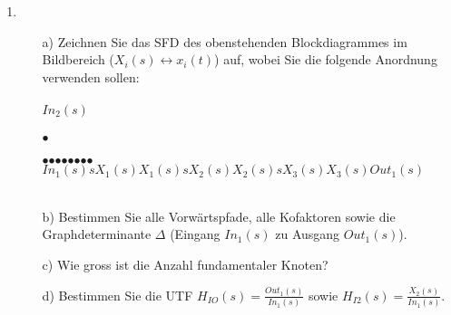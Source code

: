 \begin{enumerate}
\newpage
\item{}~\\
 \vspace*{-2mm} \begin{center}     \end{center} %
\begin{enumerate}
\item[a)] Zeichnen Sie das SFD des obenstehenden Blockdiagrammes im Bildbereich ($X_i(s)\leftrightarrow x_i(t)$) auf, wobei Sie die folgende Anordnung verwenden sollen:\\
\vspace*{0.5cm}\\
\hspace*{9.8cm}$In_2(s)$\\
\vspace*{-0.3cm}\\
\hspace*{9.9cm}$\bullet$\\
\vspace*{1.8cm}\\
\hspace*{0cm}$\bullet$\hspace*{1.8cm}$\bullet$\hspace*{1.8cm}$\bullet$\hspace*{1.8cm}$\bullet$\hspace*{1.8cm}$\bullet$\hspace*{1.8cm}$\bullet$\hspace*{1.89cm}$\bullet$\hspace*{1.98cm}$\bullet$\\
\hspace*{-0.45cm}$In_1(s)$\hspace*{0.92cm}$sX_1(s)$\hspace*{0.92cm}$X_1(s)$\hspace*{0.93cm}$sX_2(s)$\hspace*{0.93cm}$X_2(s)$\hspace*{0.93cm}$sX_3(s)$\hspace*{0.93cm}$X_3(s)$\hspace*{0.92cm}$Out_1(s)$\\
\vspace*{2cm}\\
\item[b)] Bestimmen Sie alle Vorw\"artspfade, alle Kofaktoren sowie die Graphdeterminante $\Delta$ (Eingang $In_1(s)$ zu Ausgang $Out_1(s)$). \\
\item[c)] Wie gross ist die Anzahl fundamentaler Knoten?\\
\item[d)] Bestimmen Sie die UTF $H_{IO}(s)=\frac{Out_1(s)}{In_1(s)}$ sowie $H_{I2}(s)=\frac{X_2(s)}{In_1(s)}$.\\

\end{enumerate}

\end{enumerate}


